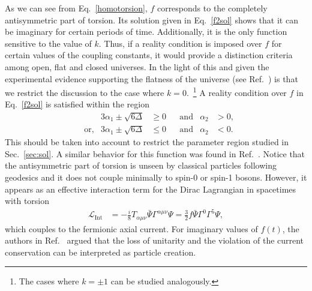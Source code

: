 \documentclass[aps,prd,12pt,superscriptaddress,showpacs,showkeys,longbibliography,reprint,nofootinbib]{revtex4-1}
\begin{document}



As we can see from Eq.~\eqref{homotorsion}, $f$ corresponds to the completely antisymmetric part of torsion. Its solution given in Eq.~\eqref{f2sol} shows that it can be imaginary for certain periods of time. Additionally, it is the only function sensitive to the value of $k$. Thus, if a reality condition is imposed over $f$ for certain values of the coupling constants, it would provide a distinction criteria among open, flat and closed universes. In the light of this and given the experimental evidence supporting the flatness of the universe (see Ref.~\cite{Spergel:2006hy}) is that we restrict the discussion to the case where $k=0$.~\footnote{The cases where $k = \pm1$ can be studied analogously.} A reality condition over $f$ in Eq.~\eqref{f2sol} is satisfied within the region 
\begin{align*}
 & & 3\alpha_1 \pm \sqrt{6\Delta} &\geq 0 & &\mbox{and}& \alpha_2 &>0, \\
 & \mbox{or,} & 3\alpha_1 \pm \sqrt{6\Delta} &\leq 0 & &\mbox{and}& \alpha_2&<0.
\end{align*}
This should be taken into account to restrict the parameter region studied in Sec.~\ref{sec:sol}.  
A similar behavior for this function was found in Ref.~\cite{Toloza:2013wi}. Notice that the antisymmetric part of torsion is unseen by classical particles following geodesics and it does not couple minimally to spin-0 or spin-1 bosons. However, it appears as an effective interaction term for the Dirac Lagrangian in spacetimes with torsion~\cite{Hehl:1976kj}
\begin{align*}
  \mathcal{L}_{\text{Int}}&=-\frac{i}{8}T_{\alpha\mu\nu}\bar{\Psi}\Gamma^{\alpha\mu\nu}\Psi =\frac{3}{2}f\bar{\Psi}\Gamma^0\Gamma^5\Psi,
\end{align*}
which couples to the fermionic axial current. For imaginary values of $f(t)$, the authors in Ref.~\cite{Toloza:2013wi} argued that the loss of unitarity and the violation of the current conservation can be interpreted as particle creation. 
\end{document}
